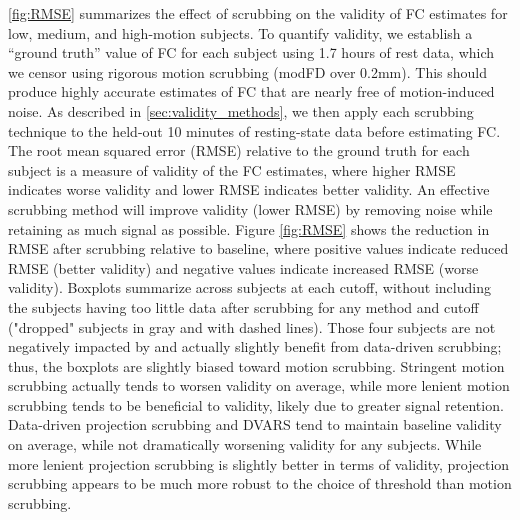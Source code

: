 \documentclass{article}
\begin{document}
\autoref{fig:RMSE} summarizes the effect of scrubbing on the validity of FC estimates for low, medium, and high-motion subjects. To quantify validity, we establish a ``ground truth'' value of FC for each subject using 1.7 hours of rest data, which we censor using rigorous motion scrubbing (modFD over 0.2mm). This should produce highly accurate estimates of FC that are nearly free of motion-induced noise. As described in \autoref{sec:validity_methods}, we then apply each scrubbing technique to the held-out 10 minutes of resting-state data before estimating FC. The root mean squared error (RMSE) relative to the ground truth for each subject is a measure of validity of the FC estimates, where higher RMSE indicates worse validity and lower RMSE indicates better validity. An effective scrubbing method will improve validity (lower RMSE) by removing noise while retaining as much signal as possible. Figure \autoref{fig:RMSE} shows the reduction in RMSE after scrubbing relative to baseline, where positive values indicate reduced RMSE (better validity) and negative values indicate increased RMSE (worse validity). Boxplots summarize across subjects at each cutoff, without including the subjects having too little data after scrubbing for any method and cutoff ("dropped" subjects in gray and with dashed lines). Those four subjects are not negatively impacted by and actually slightly benefit from data-driven scrubbing; thus, the boxplots are slightly biased toward motion scrubbing. Stringent motion scrubbing actually tends to worsen validity on average, while more lenient motion scrubbing tends to be beneficial to validity, likely due to greater signal retention. Data-driven projection scrubbing and DVARS tend to maintain baseline validity on average, while not dramatically worsening validity for any subjects. While more lenient projection scrubbing is slightly better in terms of validity, projection scrubbing appears to be much more robust to the choice of threshold than motion scrubbing.

\end{document}

